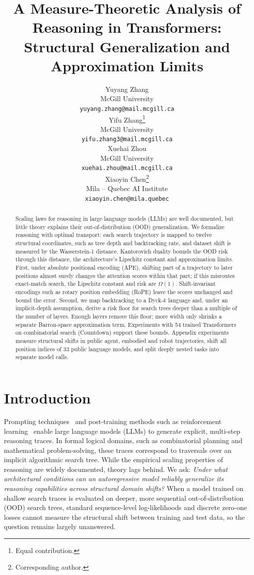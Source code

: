 \documentclass{article}
\title{A Measure-Theoretic Analysis of Reasoning in Transformers: Structural Generalization and Approximation Limits
}
\author{
  Yuyang Zhang\\
  McGill University\\
  \texttt{yuyang.zhang@mail.mcgill.ca} \\
  \And
  Yifu Zhang\thanks{Equal contribution.}\\
  McGill University \\
  \texttt{yifu.zhang3@mail.mcgill.ca} \\
  \AND
  Xuehai Zhou\footnotemark[1]\\
  McGill University \\
  \texttt{xuehai.zhou@mail.mcgill.ca} \\
  \And
  Xiaoyin Chen\thanks{Corresponding author.} \\ %
  Mila -- Quebec AI Institute \\
  \texttt{xiaoyin.chen@mila.quebec} \\
}
\begin{document}
\maketitle
\begin{abstract}
Scaling laws for reasoning in large language models (LLMs) are well documented, but little theory explains their out-of-distribution (OOD) generalization. We formalize reasoning with optimal transport: each search trajectory is mapped to twelve structural coordinates, such as tree depth and backtracking rate, and dataset shift is measured by the Wasserstein-1 distance. Kantorovich duality bounds the OOD risk through this distance, the architecture's Lipschitz constant and approximation limits. First, under absolute positional encoding (APE), shifting part of a trajectory to later positions almost surely changes the attention scores within that part; if this misroutes exact-match search, the Lipschitz constant and risk are $\Omega(1)$. Shift-invariant encodings such as rotary position embedding (RoPE) leave the scores unchanged and bound the error. Second, we map backtracking to a Dyck-$k$ language and, under an implicit-depth assumption, derive a risk floor for search trees deeper than a multiple of the number of layers. Enough layers remove this floor; more width only shrinks a separate Barron-space approximation term. Experiments with 54 trained Transformers on combinatorial search (Countdown) support these bounds. Appendix experiments measure structural shifts in public agent, embodied and robot trajectories, shift all position indices of 33 public language models, and split deeply nested tasks into separate model calls.
\end{abstract}

\section{Introduction}
\label{sec:intro}

Prompting techniques~\citep{wei2023chainofthoughtpromptingelicitsreasoning,yao2023treethoughtsdeliberateproblem} and post-training methods such as reinforcement learning~\citep{lightman2023let, o1, deepseekai2025deepseekr1incentivizingreasoningcapability,lambert2024tulu} enable large language models (LLMs) to generate explicit, multi-step reasoning traces. In formal logical domains, such as combinatorial planning and mathematical problem-solving, these traces correspond to traversals over an implicit algorithmic search tree. While the empirical scaling properties of reasoning are widely documented, theory lags behind. We ask: \textit{Under what architectural conditions can an autoregressive model reliably generalize its reasoning capabilities across structural domain shifts?} When a model trained on shallow search traces is evaluated on deeper, more sequential out-of-distribution (OOD) search trees, standard sequence-level log-likelihoods and discrete zero-one losses cannot measure the structural shift between training and test data, so the question remains largely unanswered.
\end{document}
